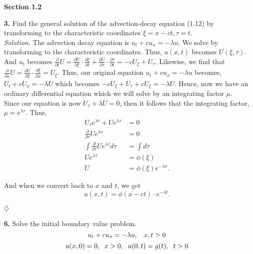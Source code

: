 \documentclass{article}
\begin{document}
\vspace{6mm}
\noindent
\textbf{Section 1.2} 

\noindent
\textbf{3.} Find the general solution of the advection-decay equation (1.12) by transforming to the characteristic coordinates  \( \xi = x -ct, \tau=t\). 
\vspace{2mm}
\\ 
\noindent
\textit{Solution.} The advection decay equation is \(u_t+cu_x = -\lambda u \). We solve by transforming to the characteristic coordinates. Thus, \( u(x,t)\) becomes \( U(\xi,\tau) \). And \(u_t \) becomes \(\frac{\partial}{\partial t}U = \frac{\partial U}{\partial \xi } \cdot \frac{\partial \xi}{\partial t} + \frac{\partial U}{\partial \tau } \cdot \frac{\partial \tau}{\partial t} = -cU_{\xi} + U_{\tau} \). Likewise, we find that \( \frac{\partial}{\partial x} U = \frac{\partial U }{\partial \xi}  \cdot \frac{\partial \xi }{\partial x } = U_{\xi}   \). Thus, our original equation \( u_t+cu_x = -\lambda u  \) becomes, \( U_t+cU_x = -\lambda U \) which becomes \(-cU_{\xi} + U_{\tau} + cU_{\xi} = -\lambda U  \). Hence, now we have an ordinary differential equation which we will solve by an integrating factor \(\mu\). Since our equation is now \( U_{\tau} + \lambda U = 0\), then it follows that the integrating factor, \(\mu = e^{\lambda \tau} \). Thus, 
\begin{align*}
U_{\tau}e^{\lambda \tau} +Ue^{\lambda \tau}  &= 0 \\
\frac{\partial}{\partial \tau}  Ue^{\lambda \tau} &= 0 \\
\int \frac{\partial}{\partial \tau}  Ue^{\lambda \tau} d\tau &= \int d\tau  \\
U e^{\lambda \tau} &= \phi(\xi) \\
U &= \phi(\xi)e^{-\lambda \tau} . 
\end{align*}

\noindent
And when we convert back to \(x \) and \(t\), we get 
\[
u(x,t)= \phi(x-ct)\cdot e^{-\lambda t}.
\]
\begin{flushright}
\( \diamondsuit \) 
\end{flushright}




\newpage
\noindent
\textbf{6.} Solve the initial boundary value problem. 
\[ 
u_t + cu_x = -\lambda u,   \hspace{3mm}  x,t>0  
\]
\[ 
u(x,0)=0,   \hspace{2mm}  x>0,  \hspace{2mm}   u(0,t)=g(t),  \hspace{2mm}  t>0 
\]
\end{document}
